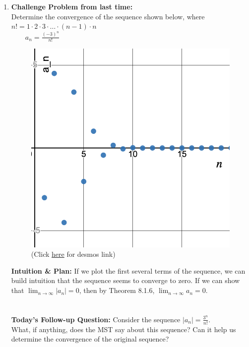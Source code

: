 \documentclass[10pt]{article}
\begin{document}
\begin{enumerate}


\item \textbf{Challenge Problem from last time:}\\
 Determine the convergence of the sequence shown below, where \(n! = 1\cdot 2 \cdot 3 \cdot \ldots \cdot (n-1) \cdot n \)\\
 \(\qquad a_n =\frac{(-3)^n}{n!} \) \\
 
 
 \begin{figure}[!h]
 \includegraphics[width=.6\textwidth]{Ch8s1-Challenge-Graph-a.png}
\caption{(Click \href{https://www.desmos.com/calculator/htfkvazzir}{here} for desmos link)}
 \end{figure}
 

  \textbf{Intuition \& Plan:} If we plot the first several terms of the sequence, we can build intuition that the sequence seems to converge to zero. If we can show that \(\lim_{n\rightarrow\infty} |a_n| = 0 \), then by Theorem 8.1.6, \(\lim_{n\rightarrow\infty} a_n = 0\).
  ~\\~\\~\\
  
  \textbf{Today's Follow-up Question:} Consider the sequence  \( |a_n | =\frac{3^n}{n!} \).\\
 What, if anything, does the MST say about this sequence? Can it help us determine the convergence of the original sequence?
  \vspace*{1in}
 


\end{enumerate}
\end{document}
